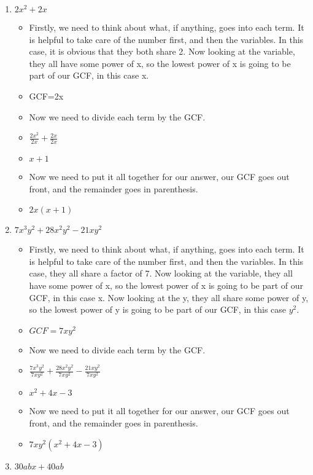 \documentclass{article}
\begin{document}
\newpage

\begin{enumerate}
\item $2x^{2} + 2x$
  \begin{itemize}
  \item Firstly, we need to think about what, if anything, goes into each term. It is helpful to take care of the number first, and then the variables. In this case, it is obvious that they both share 2. Now looking at the variable, they all have some power of x, so the lowest power of x is going to be part of our GCF, in this case x.
  \item [] GCF=2x
  \item Now we need to divide each term by the GCF.
  \item [] {\Large $\frac{2x^{2}}{2x} + \frac{2x}{2x}$}
  \item [] $x+1$
  \item Now we need to put it all together for our answer, our GCF goes out front, and the remainder goes in parenthesis.
  \item $2x(x+1)$
  \end{itemize}
\item $7x^{3}y^{2} + 28x^{2}y^{2} - 21xy^{2}$
  \begin{itemize}
  \item Firstly, we need to think about what, if anything, goes into each term. It is helpful to take care of the number first, and then the variables. In this case, they all share a factor of 7. Now looking at the variable, they all have some power of x, so the lowest power of x is going to be part of our GCF, in this case x. Now looking at the y, they all share some power of y, so the lowest power of y is going to be part of our GCF, in this case $y^{2}$.
  \item [] $GCF=7xy^{2}$
  \item Now we need to divide each term by the GCF.
  \item [] {\Large $\frac{7x^{3}y^{2}}{7xy^{2}} + \frac{28x^{2}y^{2}}{7xy^{2}} - \frac{21xy^{2}}{7xy^{2}}$}
  \item [] $x^{2}+4x-3$
  \item Now we need to put it all together for our answer, our GCF goes out front, and the remainder goes in parenthesis.
  \item $7xy^{2}(x^{2}+4x-3)$
  \end{itemize}
\item $30abx + 40ab$
  \begin{itemize}

\end{itemize}
\end{enumerate}
\end{document}
